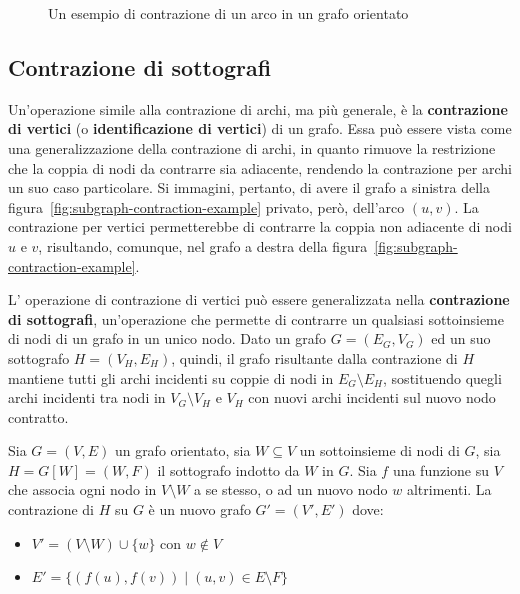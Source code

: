 \begin{figure}[h]
    \centering
    
    \caption{Un esempio di contrazione di un arco in un grafo orientato}
    \label{fig:edge-contraction-example}
\end{figure}

\subsection{Contrazione di sottografi}\label{subsec:contrazione-di-sottografi}
Un'operazione simile alla contrazione di archi, ma pi\`u generale, \`e la \textbf{contrazione di vertici}
(o \textbf{identificazione di vertici}) di un grafo.
Essa pu\`o essere vista come una generalizzazione della contrazione di archi, in quanto rimuove la restrizione che
la coppia di nodi da contrarre sia adiacente, rendendo la contrazione per archi un suo caso particolare.
Si immagini, pertanto, di avere il grafo a sinistra della figura~\ref{fig:subgraph-contraction-example} privato,
per\`o, dell'arco $(u, v)$.
La contrazione per vertici permetterebbe di contrarre la coppia non adiacente di nodi $u$ e $v$, risultando,
comunque, nel grafo a destra della figura~\ref{fig:subgraph-contraction-example}. \newline

L' operazione di contrazione di vertici pu\`o essere generalizzata nella \textbf{contrazione di sottografi},
un'operazione che permette di contrarre un qualsiasi sottoinsieme di nodi di un grafo in un unico nodo.
Dato un grafo $G = (E_G, V_G)$ ed un suo sottografo $H = (V_H, E_H)$, quindi, il grafo risultante dalla contrazione
di $H$ mantiene tutti gli archi incidenti su coppie di nodi in $E_G \setminus E_H$, sostituendo
quegli archi incidenti tra nodi in $V_G \setminus V_H$ e $V_H$ con nuovi archi incidenti sul nuovo nodo contratto.

\begin{definition}
    Sia $G = (V, E)$ un grafo orientato, sia $W \subseteq V$ un sottoinsieme di nodi di $G$, sia $H = G[W] = (W, F)$
    il sottografo indotto da $W$ in $G$.
    Sia $f$ una funzione su $V$ che associa ogni nodo in $V \setminus W$ a se stesso, o ad un nuovo nodo $w$
    altrimenti.
    La contrazione di $H$ su $G$ \`e un nuovo grafo $G' = (V', E')$ dove:
    \begin{itemize}
        \item $V' = (V \setminus W) \cup \{w\}$ con $w \notin V$
        \item $E' = \{(f(u), f(v)) \mid (u, v) \in E \setminus F\}$
    \end{itemize}
\end{definition}

